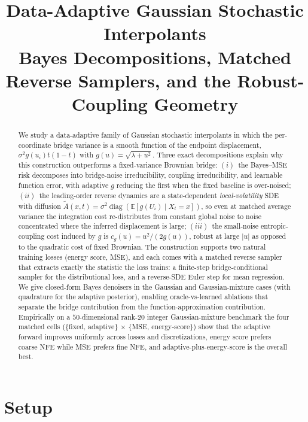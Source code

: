 \documentclass[11pt]{article}
\title{Data-Adaptive Gaussian Stochastic Interpolants \\
  \large Bayes Decompositions, Matched Reverse Samplers, and the Robust-Coupling Geometry}
\author{}
\date{}
\newcommand{\E}{\mathbb{E}}
\newcommand{\diag}{\operatorname{diag}}
\begin{document}
\maketitle

\begin{abstract}
    We study a data-adaptive family of Gaussian stochastic interpolants in
    which the per-coordinate bridge variance is a smooth function of the
    endpoint displacement, $\sigma^2 g(u_i) t(1-t)$ with
    $g(u) = \sqrt{\lambda + u^2}$. Three exact decompositions explain why
    this construction outperforms a fixed-variance Brownian bridge:
    $(i)$~the Bayes--MSE risk decomposes into bridge-noise irreducibility,
    coupling irreducibility, and learnable function error, with adaptive
    $g$ reducing the first when the fixed baseline is over-noised;
    $(ii)$~the leading-order reverse dynamics are a state-dependent
    \emph{local-volatility} SDE with diffusion
    $\widetilde A(x,t) = \sigma^2 \diag(\E[g(U_i)\mid X_t=x])$, so even at
    matched average variance the integration cost re-distributes from
    constant global noise to noise concentrated where the inferred
    displacement is large; $(iii)$~the small-noise entropic-coupling cost
    induced by $g$ is $c_g(u) = u^2 / (2g(u))$, robust at large $|u|$ as
    opposed to the quadratic cost of fixed Brownian. The construction
    supports two natural training losses (energy score, MSE), and each
    comes with a matched reverse sampler that extracts exactly the
    statistic the loss trains: a finite-step bridge-conditional sampler
    for the distributional loss, and a reverse-SDE Euler step for
    mean regression. We give closed-form Bayes denoisers in the Gaussian
    and Gaussian-mixture cases (with quadrature for the adaptive
    posterior), enabling oracle-vs-learned ablations that separate the
    bridge contribution from the function-approximation contribution.
    Empirically on a $50$-dimensional rank-$20$ integer Gaussian-mixture
    benchmark the four matched cells (\{fixed, adaptive\} $\times$ \{MSE,
    energy-score\}) show that the adaptive forward improves uniformly
    across losses and discretizations, energy score prefers coarse NFE
    while MSE prefers fine NFE, and adaptive-plus-energy-score is the
    overall best.
\end{abstract}

\section{Setup}
\end{document}
